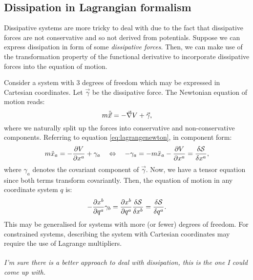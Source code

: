 \documentclass{article}
\begin{document}
\subsection{Dissipation in Lagrangian formalism}
Dissipative systems are more tricky to deal with due to the fact that dissipative forces are not conservative and so not derived from potentials. Suppose we can express dissipation in form of some \textit{dissipative forces}. Then, we can make use of the transformation property of the functional derivative to incorporate dissipative forces into the equation of motion. 
\par
Consider a system with 3 degrees of freedom which may be expressed in Cartesian coordinates. Let $\vec{\gamma}$ be the dissipative force. The Newtonian equation of motion reads:
\begin{equation}
    m \ddot{\vec{x}} = -\vec{\nabla} V + \vec{\gamma},
\end{equation}
where we naturally split up the forces into conservative and non-conservative components. Referring to equation \eqref{eq:lagrangenewton}, in component form:
\begin{equation}
    m \ddot{x}_a = -\pdv{V}{x^a} + \gamma_a \equivalent -\gamma_a = -m\ddot{x}_a - \pdv{V}{x^a} = \fdv{\mathcal{S}}{x^a},
\end{equation}
where $\gamma_a$ denotes the covariant component of $\vec{\gamma}$. Now, we have a tensor equation since both terms transform covariantly. Then, the equation of motion in any coordinate system $q$ is:
\begin{equation}
    -\pdv{x^b}{q^a} \gamma_b = \pdv{x^b}{q^a} \fdv{\mathcal{S}}{x^b} = \fdv{\mathcal{S}}{q^a}.
\end{equation}
This may be generalised for systems with more (or fewer) degrees of freedom. For constrained systems, describing the system with Cartesian coordinates may require the use of Lagrange multipliers.
\\\\
\textit{I'm sure there is a better approach to deal with dissipation, this is the one I could come up with.}
\end{document}
